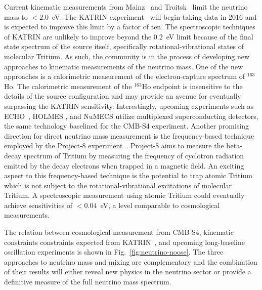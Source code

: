 Current kinematic measurements from Mainz~\cite{Kraus:2004zw} and Troitsk~\cite{Aseev:2011dq} limit the neutrino mass to $< 2.0$~eV. The KATRIN experiment~\cite{Angrik:2005ep} will begin taking data in 2016 and is expected to improve this limit by a factor of ten. The spectroscopic techniques of KATRIN are unlikely to improve beyond the $0.2$~eV limit because of the final state spectrum of the source itself, specifically rotational-vibrational states of molecular Tritium. As such, the community is in the process of developing new approaches to kinematic measurements of the neutrino mass. One of the new approaches is a calorimetric measurement of the electron-capture spectrum of $^{163}$Ho. The calorimetric measurement of the $^{163}$Ho endpoint is insensitive to the details of the source configuration and may provide an avenue for eventually surpassing the KATRIN sensitivity. Interestingly, upcoming experiments such as ECHO~\cite{Eliseev:2015pda}, HOLMES \cite{Ceriale:2015mtn}, and NuMECS utilize multiplexed superconducting detectors, the same technology baselined for the CMB-S4 experiment. Another promising direction for direct neutrino mass measurement is the frequency-based technique employed by the Project-8 experiment~\cite{Asner:2014cwa}. Project-8 aims to measure the beta-decay spectrum of Tritium by measuring the frequency of cyclotron radiation emitted by the decay electrons when trapped in a magnetic field. An exciting aspect to this frequency-based technique is the potential to trap atomic Tritium which is not subject to the rotational-vibrational excitations of molecular Tritium. A spectroscopic measurement using atomic Tritium could eventually achieve sensitivities of $<0.04$~eV, a level comparable to cosmological measurements.


The relation between cosmological measurement from CMB-S4, kinematic constraints constraints expected from KATRIN~\cite{Angrik:2005ep}, and upcoming long-baseline oscillation experiments is shown in Fig.~\ref{fig:neutrino-noose}. The three approaches to neutrino mass and mixing are complementary and the combination of their results will either reveal new physics in the neutrino sector or provide a definitive measure of the full neutrino mass spectrum.

